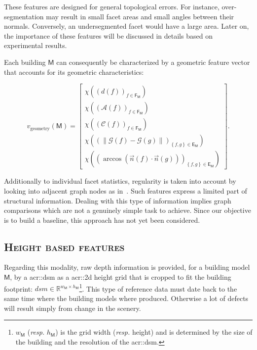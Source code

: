         These features are designed for general topological errors.
        For instance, over-segmentation may result in small facet areas and small angles between their normals.
        Conversely, an undersegmented facet would have a large area.
        Later on, the importance of these features will be discussed in details based on experimental results.
        
        Each building $\mathsf{M}$ can consequently be characterized by a geometric feature vector that accounts for its geometric characteristics:

        \begin{equation}
        	\label{eq::geometric_features}
            v_{\text{geometry}}(\mathsf{M}) = \begin{bmatrix}
            	\chi \left(\left(d\left(f\right)\right)_{f \in \mathsf{F_M}}\right)\\
                \chi \left(\left(\mathscr{A}\left(f\right)\right)_{f \in \mathsf{F_M}}\right)\\
                \chi \left(\left(\mathscr{C}\left(f\right)\right)_{f \in \mathsf{F_M}}\right)\\
                \chi \left(\left( \left\lVert \mathscr{G}\left(f\right) - \mathscr{G}\left(g\right) \right\rVert \right)_{\left\{f, g\right\} \in \mathsf{E_M}}\right)\\
                \chi \left(\left( \arccos\left(\vec{n}\left(f\right) \cdot \vec{n}\left(g\right)\right) \right)_{\left\{f, g\right\} \in \mathsf{E_M}}\right)
            \end{bmatrix}.
        \end{equation}

        Additionally to individual facet statistics, regularity is taken into account by looking into adjacent graph nodes as in~\parencite{zhou20102}.
        Such features express a limited  part of structural information.
        Dealing with this type of information implies graph comparisons which are not a genuinely simple task to achieve.
        Since our objective is to build a baseline, this approach has not yet been considered.

    \subsection{\textsc{Height based features}}
        \label{subsec::learned_evaluation::baseline::height}
        Regarding this modality, raw depth information is provided, for a building model \(\mathsf{M}\), by a \gls{acr::dsm} as a \gls{acr::2d} height grid that is cropped to fit the building footprint: $dsm \in \mathbb{R}^{w_{\mathsf{M}} \times h_{\mathsf{M}}}$\footnote{\label{note::w_h}\(w_{\mathsf{M}}\) (\textit{resp.} \(h_{\mathsf{M}}\)) is the grid width (\textit{resp.} height) and is determined by the size of the building and the resolution of the \gls{acr::dsm}.}.
        This type of reference data must date back to the same time where the building models where produced.
        Otherwise a lot of defects will result simply from change in the scenery.\\

